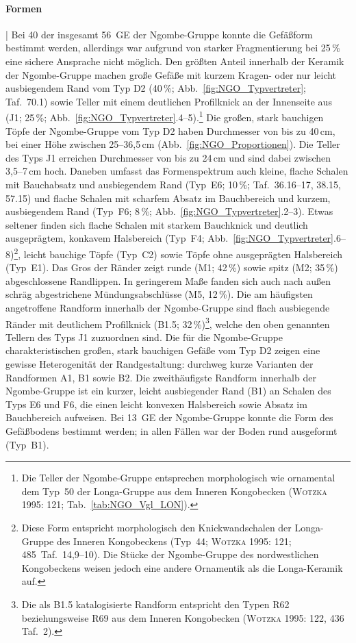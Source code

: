 \paragraph{Formen}\hspace{-.5em}|\hspace{.5em}%
Bei 40 der insgesamt 56~GE der Ngombe-Gruppe konnte die Gefäßform bestimmt werden, allerdings war aufgrund von starker Fragmentierung bei 25\,\% eine sichere Ansprache nicht möglich. Den größten Anteil innerhalb der Keramik der Ngombe-Gruppe machen große Gefäße mit kurzem Kragen- oder nur leicht ausbiegendem Rand vom Typ D2 (40\,\%; Abb.~\ref{fig:NGO_Typvertreter}; Taf.~70.1) sowie Teller mit einem deutlichen Profilknick an der Innenseite aus (J1; 25\,\%; Abb.~\ref{fig:NGO_Typvertreter}.4--5).\footnote{Die Teller der Ngombe-Gruppe entsprechen morphologisch wie ornamental dem Typ~50 der Longa-Gruppe aus dem Inneren Kongobecken (\textsc{Wotzka} 1995: 121; Tab.~\ref{tab:NGO_Vgl_LON}).} Die großen, stark bauchigen Töpfe der Ngombe-Gruppe vom Typ D2 haben Durchmesser von bis zu 40\,cm, bei einer Höhe zwischen 25--36,5\,cm (Abb.~\ref{fig:NGO_Proportionen}). Die Teller des Typs J1 erreichen Durchmesser von bis zu 24\,cm und sind dabei zwischen 3,5--7\,cm hoch. Daneben umfasst das Formenspektrum auch kleine, flache Schalen mit Bauchabsatz und ausbiegendem Rand (Typ~E6; 10\,\%; Taf.~36.16--17, 38.15, 57.15) und flache Schalen mit scharfem Absatz im Bauchbereich und kurzem, ausbiegendem Rand (Typ~F6; 8\,\%; Abb.~\ref{fig:NGO_Typvertreter}.2--3). Etwas seltener finden sich flache Schalen mit starkem Bauchknick und deutlich ausgeprägtem, konkavem Halsbereich (Typ~F4; Abb.~\ref{fig:NGO_Typvertreter}.6--8)\footnote{Diese Form entspricht morphologisch den Knickwandschalen der Longa-Gruppe des Inneren Kongobeckens (Typ~44; \textsc{Wotzka} 1995: 121; 485~Taf.~14,9--10). Die Stücke der Ngombe-Gruppe des nordwestlichen Kongobeckens weisen jedoch eine andere Ornamentik als die Longa-Keramik auf.}, leicht bauchige Töpfe (Typ~C2) sowie Töpfe ohne ausgeprägten Halsbereich (Typ~E1). Das Gros der Ränder zeigt runde (M1; 42\,\%) sowie spitz (M2; 35\,\%) abgeschlossene Randlippen. In geringerem Maße fanden sich auch nach außen schräg abgestrichene Mündungsabschlüsse (M5, 12\,\%). Die am häufigsten angetroffene Randform innerhalb der Ngombe-Gruppe sind flach ausbiegende Ränder mit deutlichem Profilknick (B1.5; 32\,\%)\footnote{Die als B1.5 katalogisierte Randform entspricht den Typen R62 beziehungsweise R69 aus dem Inneren Kongobecken (\textsc{Wotzka} 1995: 122, 436 Taf.~2).}, welche den oben genannten Tellern des Typs J1 zuzuordnen sind. Die für die Ngombe-Gruppe charakteristischen großen, stark bauchigen Gefäße vom Typ D2 zeigen eine gewisse Heterogenität der Randgestaltung: durchweg kurze Varianten der Randformen A1, B1 sowie B2. Die zweithäufigste Randform innerhalb der Ngombe-Gruppe ist ein kurzer, leicht ausbiegender Rand (B1) an Schalen des Typs E6 und F6, die einen leicht konvexen Halsbereich sowie Absatz im Bauchbereich aufweisen. Bei 13~GE der Ngombe-Gruppe konnte die Form des Gefäßbodens bestimmt werden; in allen Fällen war der Boden rund ausgeformt (Typ~B1).

